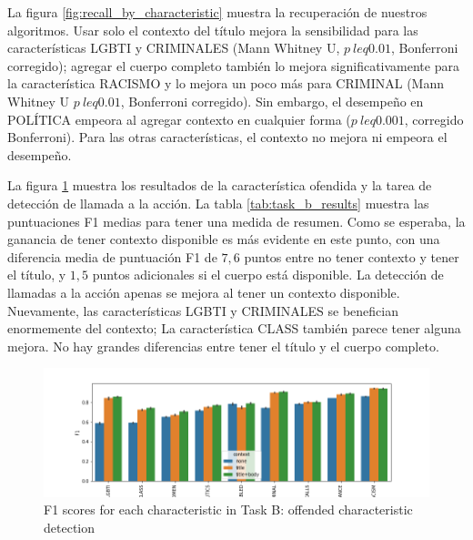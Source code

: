 La figura \ref{fig:recall_by_characteristic} muestra la recuperación de nuestros algoritmos. Usar solo el contexto del título mejora la sensibilidad para las características LGBTI y CRIMINALES (Mann Whitney U, $ p \ leq 0.01 $, Bonferroni corregido); agregar el cuerpo completo también lo mejora significativamente para la característica RACISMO y lo mejora un poco más para CRIMINAL (Mann Whitney U $ p \ leq 0.01 $, Bonferroni corregido). Sin embargo, el desempeño en POLÍTICA empeora al agregar contexto en cualquier forma ($ p \ leq 0.001 $, corregido Bonferroni). Para las otras características, el contexto no mejora ni empeora el desempeño.



La figura \ref{fig:task_b_results} muestra los resultados de la característica ofendida y la tarea de detección de llamada a la acción. La tabla \ref{tab:task_b_results} muestra las puntuaciones F1 medias para tener una medida de resumen. Como se esperaba, la ganancia de tener contexto disponible es más evidente en este punto, con una diferencia media de puntuación F1 de $ 7,6 $ puntos entre no tener contexto y tener el título, y $ 1,5 $ puntos adicionales si el cuerpo está disponible. La detección de llamadas a la acción apenas se mejora al tener un contexto disponible. Nuevamente, las características LGBTI y CRIMINALES se benefician enormemente del contexto; La característica CLASS también parece tener alguna mejora. No hay grandes diferencias entre tener el título y el cuerpo completo.

\begin{figure}[t]
    \centering
    \includegraphics[width=\textwidth]{img/task_b_scores.png}
    \caption{F1 scores for each characteristic in Task B: offended characteristic detection}
    \label{fig:task_b_results}
\end{figure}


